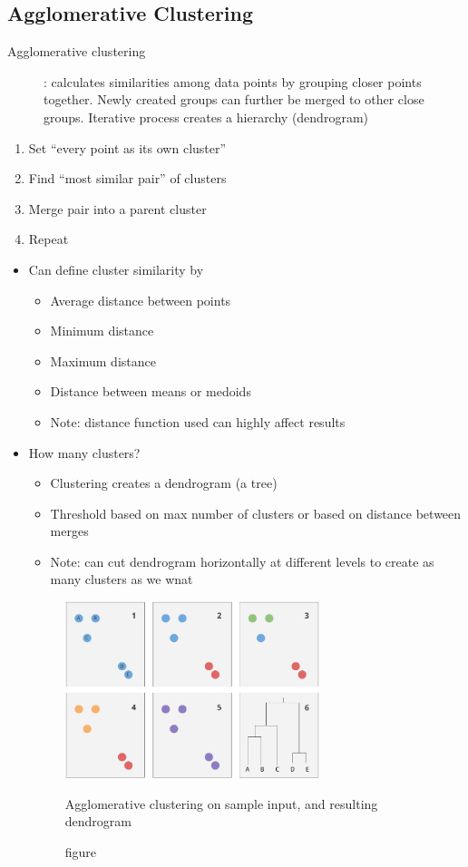 \documentclass[letterpaper,12pt]{article}
\begin{document}
\subsection{Agglomerative Clustering}
\begin{description}
 \item[Agglomerative clustering]: calculates similarities among data points by grouping closer points together. Newly created groups can further be merged to other close groups. Iterative process creates a hierarchy (dendrogram)
\end{description}
\begin{enumerate}
 \item Set ``every point as its own cluster''
 \item Find ``most similar pair'' of clusters
 \item Merge pair into a parent cluster
 \item Repeat
\end{enumerate}
\begin{itemize}
 \item Can define cluster similarity by
       \begin{itemize}
        \item Average distance between points
        \item Minimum distance
        \item Maximum distance
        \item Distance between means or medoids
        \item Note: distance function used can highly affect results
       \end{itemize}
 \item How many clusters?
       \begin{itemize}
        \item Clustering creates a dendrogram (a tree)
        \item Threshold based on max number of clusters or based on distance between merges
        \item Note: can cut dendrogram horizontally at different levels to create as many clusters as we wnat
       \end{itemize}
       \begin{figure}
        \centering
        \includegraphics[width=0.70\textwidth]{images/dendrogram2.png}
        \caption{figure}{Agglomerative clustering on sample input, and resulting dendrogram}
       \end{figure}
\end{itemize}
\end{document}
